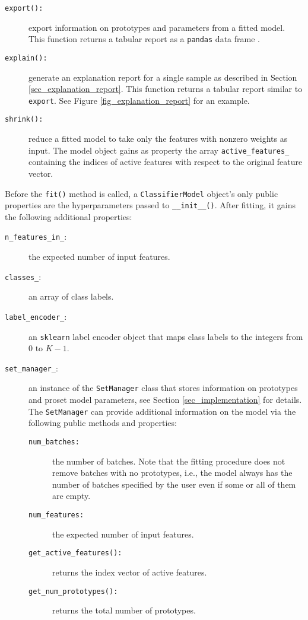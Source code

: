 \begin{description}
\begin{description}
\begin{description}
%
\item[\texttt{export():}] export information on prototypes and parameters from a fitted model.
This function returns a tabular report as a \texttt{pandas} data frame \cite{McKinney_10}.
%
\item[\texttt{explain():}] generate an explanation report for a single sample as described in Section \ref{sec_explanation_report}.
This function returns a tabular report similar to \texttt{export}.
See Figure \ref{fig_explanation_report} for an example.
%
\item[\texttt{shrink():}] reduce a fitted model to take only the features with nonzero weights as input.
The model object gains as property the array \texttt{active\_features\_} containing the indices of active features with respect to the original feature vector.
\end{description}
%
Before the \texttt{fit()} method is called, a \texttt{ClassifierModel} object's only public properties are the hyperparameters passed to \texttt{\_\_init\_\_()}.
After fitting, it gains the following additional properties:
%
\begin{description}
\item[\texttt{n\_features\_in\_}:] the expected number of input features.
%
\item[\texttt{classes\_}:] an array of class labels.
%
\item[\texttt{label\_encoder\_}:] an \texttt{sklearn} label encoder object that maps class labels to the integers from 0 to $K-1$.
%
\item[\texttt{set\_manager\_}:] an instance of the \texttt{SetManager} class that stores information on prototypes and proset model parameters, see Section \ref{sec_implementation} for details.
The \texttt{SetManager} can provide additional information on the model via the following public methods and properties:
%
\begin{description}
\item[\texttt{num\_batches:}] the number of batches.
Note that the fitting procedure does not remove batches with no prototypes, i.e., the model always has the number of batches specified by the user even if some or all of them are empty.
%
\item[\texttt{num\_features:}] the expected number of input features.
%
\item[\texttt{get\_active\_features():}] returns the index vector of active features.
%
\item[\texttt{get\_num\_prototypes():}] returns the total number of prototypes.

\end{description}
\end{description}
\end{description}
\end{description}
